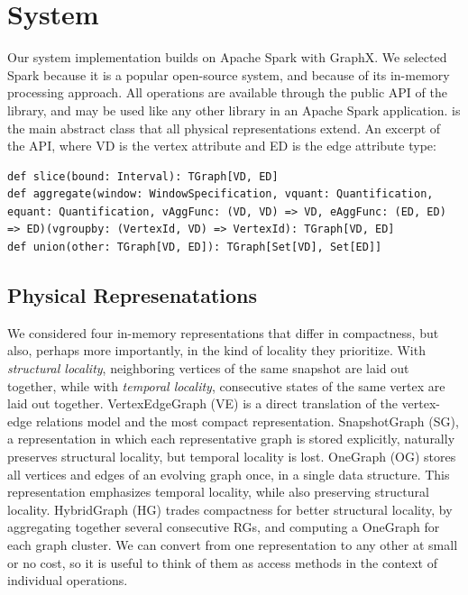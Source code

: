 \section{System}
\label{sec:sys}

Our \ql system implementation builds on Apache Spark with GraphX.  We
selected Spark because it is a popular open-source system, and because
of its in-memory processing approach.  All \tg operations are
available through the public API of the \ql library, and may be used
like any other library in an Apache Spark application.  
is the main abstract class that all physical representations extend.
An excerpt of the API, where VD is the vertex attribute and ED is the
edge attribute type:

\begin{lstlisting}
def slice(bound: Interval): TGraph[VD, ED]
def aggregate(window: WindowSpecification, vquant: Quantification, equant: Quantification, vAggFunc: (VD, VD) => VD, eAggFunc: (ED, ED) => ED)(vgroupby: (VertexId, VD) => VertexId): TGraph[VD, ED]
def union(other: TGraph[VD, ED]): TGraph[Set[VD], Set[ED]]
\end{lstlisting}

\subsection{Physical Represenatations}
\label{sec:sys:datastructs}

We considered four in-memory \tg representations that differ in
compactness, but also, perhaps more importantly, in the kind of
locality they prioritize. With {\em structural locality}, neighboring
vertices of the same snapshot are laid out together, while with {\em
  temporal locality}, consecutive states of the same vertex are laid
out together.  VertexEdgeGraph (VE) is a direct translation of the
vertex-edge relations model and the most compact representation.
SnapshotGraph (SG), a representation in which each representative
graph is stored explicitly, naturally preserves structural locality,
but temporal locality is lost. OneGraph (OG) stores all vertices and
edges of an evolving graph once, in a single data structure.  This
representation emphasizes temporal locality, while also preserving
structural locality.  HybridGraph (HG) trades compactness for better
structural locality, by aggregating together several consecutive RGs,
and computing a OneGraph for each graph cluster.  We can convert from
one representation to any other at small or no cost, so it is useful
to think of them as access methods in the context of individual
operations.


